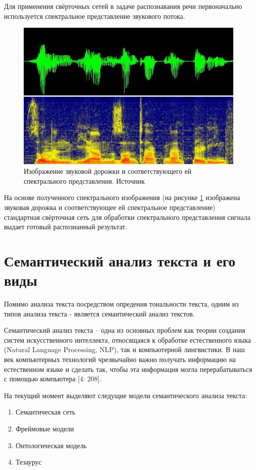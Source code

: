 \begin{itemize}
\begin{itemize}
Для применения свёрточных сетей в задаче распознавания речи первоначально используется спектральное представление звукового потока.

\begin{figure}[h]
\includegraphics[width=0.75\columnwidth]{./img/recur_10.jpg}
\centering
\caption{ Изображение звуковой дорожки и соответствующего ей спектрального представления. Источник \cite{9_recur}}
\label{pic:recur_10}
\end{figure}

На основе полученного спектрального изображения (на рисунке \ref{pic:recur_10} изображена звуковая дорожка и соответствующее ей спектральное представление) 
стандартная свёрточная сеть для обработки спектрального представления сигнала выдает готовый распознанный результат.

\section{Семантический анализ текста и его виды}

Помимо анализа текста посредством опредения тональности текста, одним из типов анализа текста - является
семантический анализ текстов.

Семантический анализ текста – одна из основных проблем как 
теории создания систем искусственного интеллекта, относящаяся 
к обработке естественного языка (Natural Language Processing, NLP), так
и компьютерной лингвистики. В наш век компьютерных технологий
чрезвычайно важно получать информацию на естественном языке и
сделать так, чтобы эта информация могла перерабатываться с помощью
компьютера [4: 208]. 

На текущий момент выделяют следущие модели семантического анализа текста:
\begin{enumerate}
  \item Семантическая сеть
  \item Фреймовые модели
  \item Онтологическая модель
  \item Тезаурус 
\end{enumerate}


\end{itemize}
\end{itemize}
